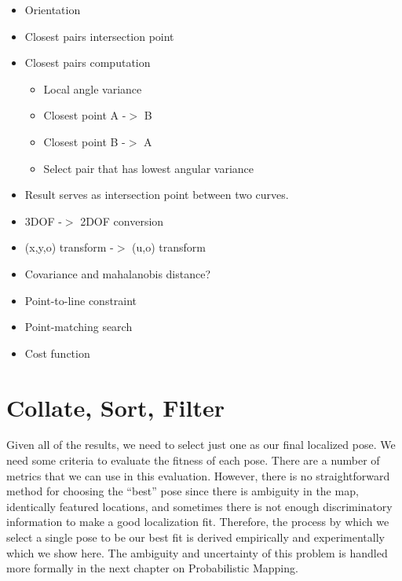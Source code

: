 \begin{itemize}
\item Orientation

\item Closest pairs intersection point

\item Closest pairs computation

\begin{itemize}
\item Local angle variance

\item Closest point A -$>$ B

\item Closest point B -$>$ A

\item Select pair that has lowest angular variance

\end{itemize}

\item Result serves as intersection point between two curves. 

\item 3DOF -$>$ 2DOF conversion

\item (x,y,o) transform -$>$ (u,o) transform

\item Covariance and mahalanobis distance? 

\item Point-to-line constraint

\item Point-matching search

\item Cost function

\end{itemize}

\section{Collate, Sort, Filter}
\label{collatesortfilter}

Given all of the results, we need to select just one as our final localized pose. We need some criteria to evaluate the fitness of each pose. There are a number of metrics that we can use in this evaluation. However, there is no straightforward method for choosing the “best” pose since there is ambiguity in the map, identically featured locations, and sometimes there is not enough discriminatory information to make a good localization fit. Therefore, the process by which we select a single pose to be our best fit is derived empirically and experimentally which we show here. The ambiguity and uncertainty of this problem is handled more formally in the next chapter on Probabilistic Mapping.

